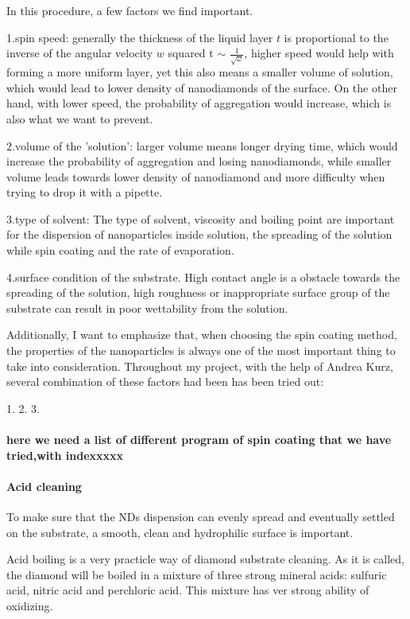 In this procedure, a few factors we find important.

1.spin speed: generally the thickness of the liquid layer $t$ is proportional to the inverse of the angular velocity $w$ squared t $\sim$ $\frac{1}{\sqrt{\omega}}$, higher speed would help with forming a more uniform layer, yet this also means a smaller volume of solution, which would lead to lower density of nanodiamonds of the surface. On the other hand, with lower speed, the probability of aggregation would increase, which is also what we want to prevent.

2.volume of the 'solution': larger volume means longer drying time, which would increase the probability of aggregation and losing nanodiamonds, while smaller volume leads towards lower density of nanodiamond and more difficulty when trying to drop it with a pipette. 

3.type of solvent: The type of solvent, viscosity and boiling point are important for the dispersion of nanoparticles inside solution, the spreading of the solution while spin coating and the rate of evaporation.

4.surface condition of the substrate. High contact angle is a obstacle towards the spreading of the solution, high roughness or inappropriate surface group of the substrate can result in poor wettability from the solution.

Additionally, I want to emphasize that, when choosing the spin coating method, the properties of the nanoparticles is always one of the most important thing to take into consideration. 
Throughout my project, with the help of Andrea Kurz, several combination of these factors had been has been tried out:

1. 
2.
3.

\paragraph{here we need a list of different program of spin coating that we have tried,with indexxxxx}

\paragraph{Acid cleaning}
To make sure that the NDs dispension can evenly spread and eventually settled on the substrate, a smooth, clean and hydrophilic surface is important.

Acid boiling is a very practicle way of diamond substrate cleaning. As it is called, the diamond will be boiled in a mixture of three strong mineral acids: sulfuric acid, nitric acid and perchloric acid. This mixture has ver strong ability of oxidizing.

